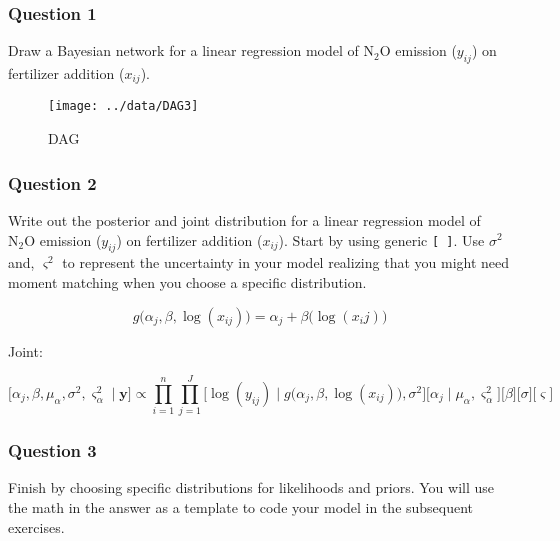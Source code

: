 \documentclass[
]{article}
\begin{document}
\hypertarget{question-1-2}{%
\subsubsection{Question 1}\label{question-1-2}}

Draw a Bayesian network for a linear regression model of
\(\textrm{N} _2 \textrm{O}\) emission (\(y_{ij}\)) on fertilizer
addition (\(x_{ij}\)).

\begin{figure}

{\centering \texttt{[image: ../data/DAG3]} 

}

\caption{DAG}\label{fig:unnamed-chunk-25}
\end{figure}

\hypertarget{question-2-2}{%
\subsubsection{Question 2}\label{question-2-2}}

Write out the posterior and joint distribution for a linear regression
model of \(\textrm{N} _2 \textrm{O}\) emission (\(y_{ij}\)) on
fertilizer addition (\(x_{ij}\)). Start by using generic
\texttt{{[}\ {]}}. Use \(\sigma^{2}\) and, \(\varsigma^{2}\) to
represent the uncertainty in your model realizing that you might need
moment matching when you choose a specific distribution.

\[
g \bigl(\alpha_{j},\beta,\log(x_{ij}) \bigr) = \alpha_{j} + \beta \bigl(\log(x_ij) \bigr)
\]

Joint:

\[
\bigl[ \alpha_{j},\beta, \mu_{\alpha}, \sigma^2, \varsigma_{\alpha}^2  \mid \boldsymbol{y} \bigr] \propto \prod_{i=1}^{n} \prod_{j=1}^{J}  \bigl[ \log(y_{ij})\mid g\bigl(\alpha_{j}, \beta,\log(x_{ij})\bigr),\sigma^{2} \bigr] \bigl[\alpha_{j} \mid \mu_{\alpha}, \varsigma_{\alpha}^2 \bigr] \bigl[ \beta \bigr] \bigl[ \sigma  \bigr] \bigl[ \varsigma  \bigr]
\]

\hypertarget{question-3-2}{%
\subsubsection{Question 3}\label{question-3-2}}

Finish by choosing specific distributions for likelihoods and priors.
You will use the math in the answer as a template to code your model in
the subsequent exercises.
\end{document}
